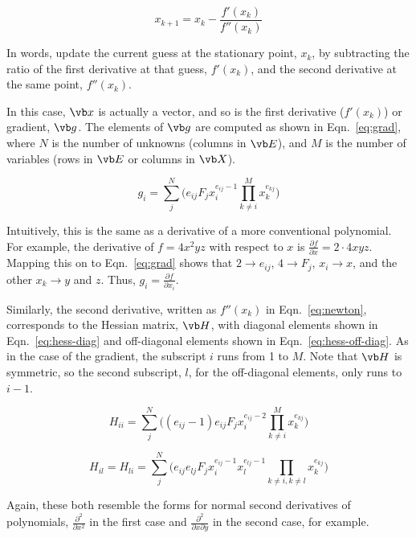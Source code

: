 \documentclass{article}
\begin{document}
\begin{equation}
  \label{eq:newton}
  x_{k+1} = x_k - \frac{f'(x_k)}{f''(x_k)}
\end{equation}

In words, update the current guess at the stationary point, $x_k$, by
subtracting the ratio of the first derivative at that guess, $f'(x_k)$, and the
second derivative at the same point, $f''(x_k)$.

In this case, $\vb x$ is actually a vector, and so is the first derivative
($f'(x_k)$) or gradient, $\vb g$. The elements of $\vb g$ are computed as shown
in Eqn.~\ref{eq:grad}, where $N$ is the number of unknowns (columns in $\vb E$),
and $M$ is the number of variables (rows in $\vb E$ or columns in $\vb X$).

\begin{equation}
  \label{eq:grad}
  g_i = \sum_j^N \bigg(
  e_{ij} F_j x_i^{e_{ij} - 1} \prod_{k \neq i}^M x_k^{e_{kj}}
  \bigg)
\end{equation}

Intuitively, this is the same as a derivative of a more conventional polynomial.
For example, the derivative of $f = 4x^2yz$ with respect to $x$ is
$\frac{\partial f}{\partial x} = 2\cdot 4xyz$. Mapping this on to
Eqn.~\ref{eq:grad} shows that $2 \rightarrow e_{ij}$, $4 \rightarrow F_j$,
$x_i \rightarrow x$, and the other $x_k \rightarrow y$ and $z$. Thus,
$g_i = \frac{\partial f}{\partial x_i}$.

Similarly, the second derivative, written as $f''(x_k)$ in Eqn.~\ref{eq:newton},
corresponds to the Hessian matrix, $\vb H$, with diagonal elements shown in
Eqn.~\ref{eq:hess-diag} and off-diagonal elements shown in
Eqn.~\ref{eq:hess-off-diag}. As in the case of the gradient, the subscript $i$
runs from 1 to $M$. Note that $\vb H$ is symmetric, so the second subscript,
$l$, for the off-diagonal elements, only runs to $i - 1$.

\begin{equation}
  \label{eq:hess-diag}
  H_{ii} = \sum_j^N
  \bigg(
  (e_{ij} - 1) e_{ij} F_j x_i^{e_{ij}-2} \prod_{k \neq i}^M x_k^{e_{kj}}
  \bigg)
\end{equation}

\begin{equation}
  \label{eq:hess-off-diag}
  H_{il} = H_{li} = \sum_j^N
  \bigg(
  e_{ij} e_{lj} F_j x_i^{e_{ij}-1} x_l^{e_{lj} -1}
  \prod_{k \neq i, k \neq l} x_k^{e_{kj}}
  \bigg)
\end{equation}

Again, these both resemble the forms for normal second derivatives of
polynomials, $\frac{\partial^2}{\partial x^2}$ in the first case and
$\frac{\partial^2}{\partial x \partial y}$ in the second case, for example.
\end{document}
